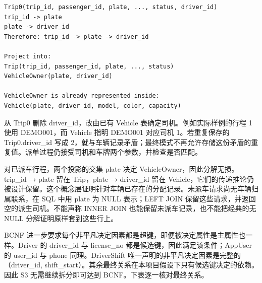 \documentclass[11pt,a4paper]{article}
\begin{document}
\begin{lstlisting}
Trip0(trip_id, passenger_id, plate, ..., status, driver_id)
trip_id -> plate
plate -> driver_id
Therefore: trip_id -> plate -> driver_id

Project into:
Trip(trip_id, passenger_id, plate, ..., status)
VehicleOwner(plate, driver_id)

VehicleOwner is already represented inside:
Vehicle(plate, driver_id, model, color, capacity)
\end{lstlisting}
从 Trip0 删除 driver\_\allowbreak{}id，改由已有 Vehicle 表确定司机。例如实际样例的行程 1 使用 DEMO001，而 Vehicle 指明 DEMO001 对应司机 1。若重复保存的 Trip0.driver\_\allowbreak{}id 写成 2，就与车辆记录矛盾；最终模式不再允许存储这份矛盾的重复值。派单过程仍接受司机和车牌两个参数，并检查是否匹配。

对已派车行程，两个投影的交集 {plate} 决定 VehicleOwner，因此分解无损。trip\_\allowbreak{}id → plate 留在 Trip，plate → driver\_\allowbreak{}id 留在 Vehicle，它们的传递推论仍被设计保留。这个概念层证明针对车辆已存在的分配记录。未派车请求尚无车辆归属联系，在 SQL 中用 plate 为 NULL 表示；LEFT JOIN 保留这些请求，并返回空的派生司机。不能声称 INNER JOIN 也能保留未派车记录，也不能把经典的无 NULL 分解证明原样套到这些行上。

BCNF 进一步要求每个非平凡决定因素都是超键，即便被决定属性是主属性也一样。Driver 的 driver\_\allowbreak{}id 与 license\_\allowbreak{}no 都是候选键，因此满足该条件；AppUser 的 user\_\allowbreak{}id 与 phone 同理。DriverShift 唯一声明的非平凡决定因素是完整的（driver\_\allowbreak{}id, shift\_\allowbreak{}start）。其余最终关系在本项目假设下只有候选键决定的依赖。因此 S3 无需继续拆分即可达到 BCNF。下表逐一核对最终关系。
\end{document}
